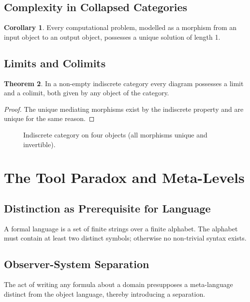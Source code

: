 \documentclass[11pt,a4paper]{article}
\theoremstyle{definition}
\newtheorem{theorem}{Theorem}[section]
\newtheorem{corollary}[theorem]{Corollary}
\begin{document}
\subsection{Complexity in Collapsed Categories}
\begin{corollary}
Every computational problem, modelled as a morphism from an input object to an output object, possesses a unique solution of length 1.
\end{corollary}

\subsection{Limits and Colimits}
\begin{theorem}
In a non-empty indiscrete category every diagram possesses a limit and a colimit, both given by any object of the category.
\end{theorem}
\begin{proof}
The unique mediating morphisms exist by the indiscrete property and are unique for the same reason.
\end{proof}

\begin{figure}[h]
\centering
{}
\caption{Indiscrete category on four objects (all morphisms unique and invertible).}
\end{figure}

\section{The Tool Paradox and Meta-Levels}
\subsection{Distinction as Prerequisite for Language}
A formal language is a set of finite strings over a finite alphabet. The alphabet must contain at least two distinct symbols; otherwise no non-trivial syntax exists.

\subsection{Observer-System Separation}
The act of writing any formula about a domain presupposes a meta-language distinct from the object language, thereby introducing a separation.
\end{document}
